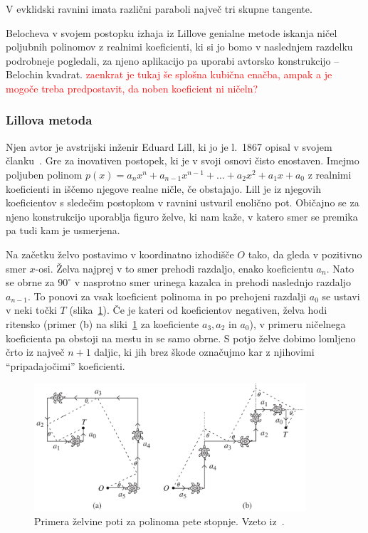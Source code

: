 \begin{posledica}
    V evklidski ravnini imata različni paraboli največ tri skupne tangente.
\end{posledica}

Belocheva v svojem postopku izhaja iz Lillove genialne metode iskanja ničel poljubnih polinomov z realnimi koeficienti, ki si jo bomo v naslednjem razdelku podrobneje pogledali, za njeno aplikacijo pa uporabi avtorsko konstrukcijo -- Belochin kvadrat. \textcolor{red}{zaenkrat je tukaj še splošna kubična enačba, ampak a je mogoče treba predpostavit, da noben koeficient ni ničeln?}

\subsubsection*{Lillova metoda}

Njen avtor je avstrijski inženir Eduard Lill, ki jo je l.\ 1867 opisal v svojem članku~\cite{lill1867}. Gre za inovativen postopek, ki je v svoji osnovi čisto enostaven. Imejmo poljuben polinom $ p(x) = a_n x^n + a_{n-1} x^{n-1} + \ldots + a_2 x^2 + a_1 x + a_0 $ z realnimi koeficienti in iščemo njegove realne ničle, če obstajajo. Lill je iz njegovih koeficientov s sledečim postopkom v ravnini ustvaril enolično pot. Običajno se za njeno konstrukcijo uporablja figuro želve, ki nam kaže, v katero smer se premika pa tudi kam je usmerjena.

Na začetku želvo postavimo v koordinatno izhodišče $O$ tako, da gleda v pozitivno smer $x$-osi. Želva najprej v to smer prehodi razdaljo, enako koeficientu $a_n$. Nato se obrne za $90^\circ$ v nasprotno smer urinega kazalca in prehodi naslednjo razdaljo $a_{n-1}$. To ponovi za vsak koeficient polinoma in po prehojeni razdalji $a_0$ se ustavi v neki točki $T$ (slika~\ref{fig:primera_zelve}). Če je kateri od koeficientov negativen, želva hodi ritensko (primer (b) na sliki~\ref{fig:primera_zelve} za koeficiente $a_3, a_2$ in $a_0$), v primeru ničelnega koeficienta pa obstoji na mestu in se samo obrne. S potjo želve dobimo lomljeno črto iz največ $n+1$ daljic, ki jih brez škode označujmo kar z njihovimi ``pripadajočimi'' koeficienti.

\begin{figure}[h]
    \centering
    \includegraphics[width=0.9\textwidth]{images/kubična enačba/primera_zelvine_poti.png}
    \caption[Primera želvine poti]{Primera želvine poti za polinoma pete stopnje. Vzeto iz~\cite[str.\ 311]{hull2011}.}
    \label{fig:primera_zelve}
\end{figure}

